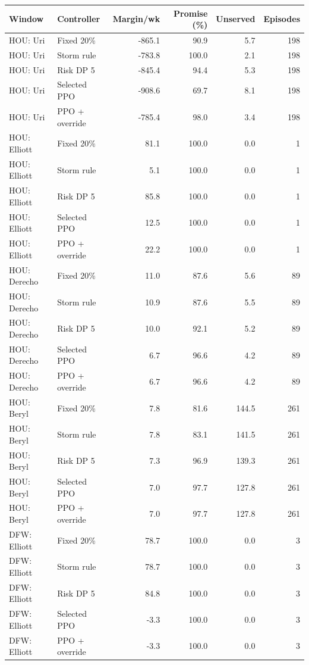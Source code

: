 \begin{tabular}{llrrrr}
\toprule
Window & Controller & Margin/wk & Promise (\%) & Unserved & Episodes \\
\midrule
HOU: Uri & Fixed 20\% & -865.1 & 90.9 & 5.7 & 198 \\
HOU: Uri & Storm rule & -783.8 & 100.0 & 2.1 & 198 \\
HOU: Uri & Risk DP 5 & -845.4 & 94.4 & 5.3 & 198 \\
HOU: Uri & Selected PPO & -908.6 & 69.7 & 8.1 & 198 \\
HOU: Uri & PPO + override & -785.4 & 98.0 & 3.4 & 198 \\
HOU: Elliott & Fixed 20\% & 81.1 & 100.0 & 0.0 & 1 \\
HOU: Elliott & Storm rule & 5.1 & 100.0 & 0.0 & 1 \\
HOU: Elliott & Risk DP 5 & 85.8 & 100.0 & 0.0 & 1 \\
HOU: Elliott & Selected PPO & 12.5 & 100.0 & 0.0 & 1 \\
HOU: Elliott & PPO + override & 22.2 & 100.0 & 0.0 & 1 \\
HOU: Derecho & Fixed 20\% & 11.0 & 87.6 & 5.6 & 89 \\
HOU: Derecho & Storm rule & 10.9 & 87.6 & 5.5 & 89 \\
HOU: Derecho & Risk DP 5 & 10.0 & 92.1 & 5.2 & 89 \\
HOU: Derecho & Selected PPO & 6.7 & 96.6 & 4.2 & 89 \\
HOU: Derecho & PPO + override & 6.7 & 96.6 & 4.2 & 89 \\
HOU: Beryl & Fixed 20\% & 7.8 & 81.6 & 144.5 & 261 \\
HOU: Beryl & Storm rule & 7.8 & 83.1 & 141.5 & 261 \\
HOU: Beryl & Risk DP 5 & 7.3 & 96.9 & 139.3 & 261 \\
HOU: Beryl & Selected PPO & 7.0 & 97.7 & 127.8 & 261 \\
HOU: Beryl & PPO + override & 7.0 & 97.7 & 127.8 & 261 \\
DFW: Elliott & Fixed 20\% & 78.7 & 100.0 & 0.0 & 3 \\
DFW: Elliott & Storm rule & 78.7 & 100.0 & 0.0 & 3 \\
DFW: Elliott & Risk DP 5 & 84.8 & 100.0 & 0.0 & 3 \\
DFW: Elliott & Selected PPO & -3.3 & 100.0 & 0.0 & 3 \\
DFW: Elliott & PPO + override & -3.3 & 100.0 & 0.0 & 3 \\
\bottomrule
\end{tabular}
